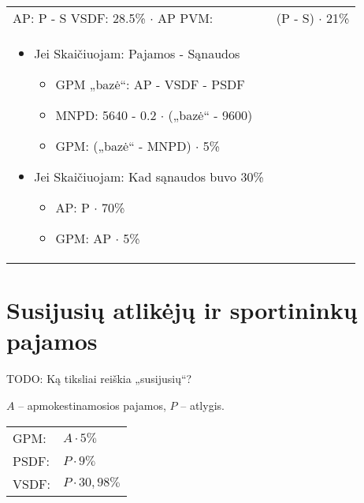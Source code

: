 \begin{tabularx}{15cm}{p{7.5cm}|p{7.5cm}}
 
  AP: P - S
  VSDF: 28.5\% $\cdot$ AP
  PVM: & (P - S) $\cdot$ 21\% \\
  
  \begin{itemize}
  	\item Jei Skaičiuojam: Pajamos - Sąnaudos
	\begin{itemize}
		\item GPM „bazė“: AP - VSDF - PSDF
  		\item MNPD: 5640 - 0.2 $\cdot$ („bazė“ - 9600)
  		\item GPM: („bazė“ - MNPD) $\cdot$ 5\%
	\end{itemize}	  	
  	
  	\item Jei Skaičiuojam: Kad sąnaudos buvo 30\%
  	\begin{itemize}
  		\item AP: P $\cdot$ 70\%
  		\item GPM: AP $\cdot$ 5\%
  	\end{itemize}
  \end{itemize}

  
  
\end{tabularx}

\section{Susijusių atlikėjų ir sportininkų pajamos}

TODO: Ką tiksliai reiškia „susijusių“?

$A$ – apmokestinamosios pajamos, $P$ – atlygis.

\begin{tabularx}{15cm}{p{7.5cm}|p{7.5cm}}
  GPM: & $A \cdot 5\%$ \\
  PSDF: & $P \cdot 9\%$ \\
  VSDF: & $P \cdot 30,98\%$ \\
\end{tabularx}

